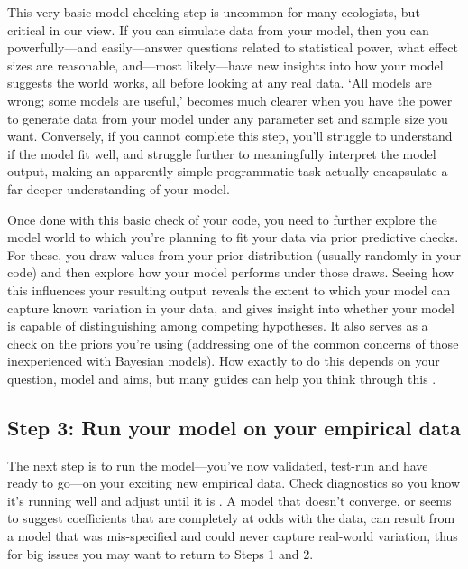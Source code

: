 \documentclass[11pt]{article}
\begin{document}
This very basic model checking step is uncommon for many ecologists, but critical in our view. If you can simulate data from your model, then you can powerfully---and easily---answer questions related to statistical power, what effect sizes are reasonable, and---most likely---have new insights into how your model suggests the world works, all before looking at any real data. `All models are wrong; some models are useful,' becomes much clearer when you have the power to generate data from your model under any parameter set and sample size you want. Conversely, if you cannot complete this step, you'll struggle to understand if the model fit well, and struggle further to meaningfully interpret the model output, making an apparently simple programmatic task actually encapsulate a far deeper understanding of your model. 

Once done with this basic check of your code, you need to further explore the model world to which you're planning to fit your data via prior predictive checks. For these, you draw values from your prior distribution (usually randomly in your code) and then explore how your model performs under those draws. Seeing how this influences your resulting output reveals the extent to which your model can capture known variation in your data, and gives insight into whether your model is capable of distinguishing among competing hypotheses. It also serves as a check on the priors you're using (addressing one of the common concerns of those inexperienced with Bayesian models). How exactly to do this depends on your question, model and aims, but many guides can help you think through this \citep{betanprior,wesner2021,winter2023}. \\


 \subsection*{Step 3: Run your model on your empirical data} 
 
The next step is to run the model---you've now validated, test-run and have ready to go---on your exciting new empirical data. Check diagnostics so you know it's running well and adjust until it is \citep[this includes a suite of convergence and efficiency metrics that are well-discussed elsewhere,][]{betanworkflow,gelman2020bayesian,vandeschoot2021,gabryvis}. A model that doesn't converge, or seems to suggest coefficients that are completely at odds with the data, can result from a model that was mis-specified and could never capture real-world variation, thus for big issues you may want to return to  Steps 1 and 2.
 
\end{document}

